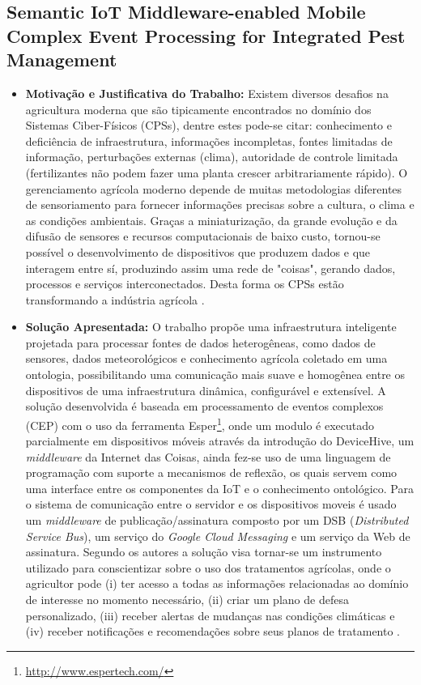 \documentclass[tid,table]{texufpel} %
\begin{document}
\subsection{Semantic IoT Middleware-enabled Mobile Complex Event Processing for Integrated Pest Management}

\begin{itemize}
	\item \textbf{Motivação e Justificativa do Trabalho:} Existem diversos desafios na agricultura moderna que são tipicamente encontrados no domínio dos Sistemas Ciber-Físicos (CPSs), dentre estes pode-se citar: conhecimento e deficiência de infraestrutura, informações incompletas, fontes limitadas de informação, perturbações externas (clima), autoridade de controle limitada (fertilizantes não podem fazer uma planta crescer arbitrariamente rápido). O gerenciamento agrícola moderno depende  de muitas metodologias diferentes de sensoriamento para fornecer informações precisas sobre a cultura, o clima e as condições ambientais. Graças a miniaturização, da grande evolução e da difusão de sensores e recursos computacionais de baixo custo, tornou-se possível o desenvolvimento de dispositivos que produzem dados e que interagem entre sí, produzindo assim uma rede de "coisas", gerando dados, processos e serviços interconectados. Desta forma os CPSs estão transformando a indústria agrícola \cite{art3nocera2017semantic}.
	
	\item \textbf{Solução Apresentada:} O trabalho propõe uma infraestrutura inteligente projetada para processar fontes de dados heterogêneas, como dados de sensores, dados meteorológicos e conhecimento agrícola coletado em uma ontologia, possibilitando uma comunicação mais suave e homogênea entre os dispositivos de uma infraestrutura dinâmica, configurável e extensível. A solução desenvolvida é baseada em processamento de eventos complexos (CEP) com o uso da ferramenta Esper\footnote{\url{http://www.espertech.com/}}, onde um modulo é executado parcialmente em dispositivos móveis através da introdução do DeviceHive, um \textit{middleware} da Internet das Coisas, ainda fez-se uso de uma linguagem de programação com suporte a mecanismos de reflexão, os quais servem como uma interface entre os componentes da IoT e o conhecimento ontológico. Para o sistema de comunicação entre o servidor e os dispositivos moveis é usado um \textit{middleware} de publicação/assinatura composto por um DSB (\textit{Distributed Service Bus}), um serviço do \textit{Google Cloud Messaging} e um serviço da Web de assinatura. Segundo os autores a solução visa tornar-se um instrumento utilizado para conscientizar sobre o uso dos tratamentos agrícolas, onde o agricultor pode (i) ter acesso a todas as informações relacionadas ao domínio de interesse no momento necessário, (ii) criar um plano de defesa personalizado, (iii) receber alertas de mudanças nas condições climáticas e (iv) receber notificações e recomendações sobre seus planos de tratamento \cite{art3nocera2017semantic}.


\end{itemize}
\end{document}
